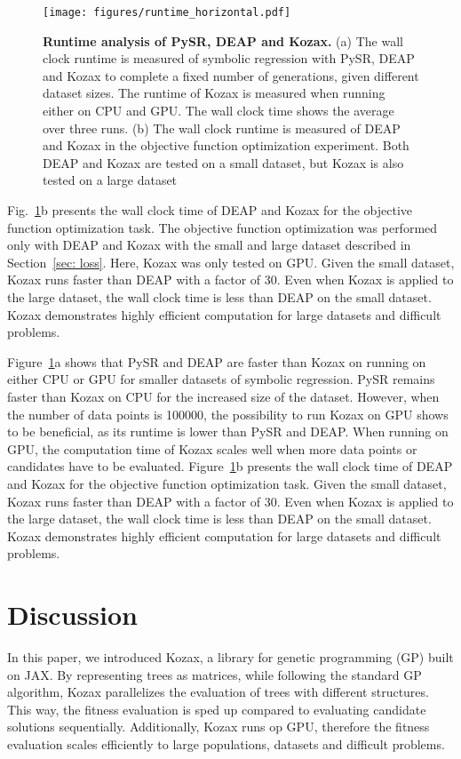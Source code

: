\documentclass{article}
\begin{document}
\begin{figure}[!b]
    \centering
    \texttt{[image: figures/runtime\_horizontal.pdf]}
    \caption{\textbf{Runtime analysis of PySR, DEAP and Kozax.} (a) The wall clock runtime is measured of symbolic regression with PySR, DEAP and Kozax to complete a fixed number of generations, given different dataset sizes. The runtime of Kozax is measured when running either on CPU and GPU. The wall clock time shows the average over three runs. (b) The wall clock runtime is measured of DEAP and Kozax in the objective function optimization experiment. Both DEAP and Kozax are tested on a small dataset, but Kozax is also tested on a large dataset}
    \label{fig:time}
\end{figure}

Fig.~\ref{fig:time}b presents the wall clock time of DEAP and Kozax for the objective function optimization task. The objective function optimization was performed only with DEAP and Kozax with the small and large dataset described in Section~\ref{sec: loss}. Here, Kozax was only tested on GPU. Given the small dataset, Kozax runs faster than DEAP with a factor of 30. Even when Kozax is applied to the large dataset, the wall clock time is less than DEAP on the small dataset. Kozax demonstrates highly efficient computation for large datasets and difficult problems.

Figure~\ref{fig:time}a shows that PySR and DEAP are faster than Kozax on running on either CPU or GPU for smaller datasets of symbolic regression. PySR remains faster than Kozax on CPU for the increased size of the dataset. However, when the number of data points is 100000, the possibility to run Kozax on GPU shows to be beneficial, as its runtime is lower than PySR and DEAP. When running on GPU, the computation time of Kozax scales well when more data points or candidates have to be evaluated. Figure~\ref{fig:time}b presents the wall clock time of DEAP and Kozax for the objective function optimization task. Given the small dataset, Kozax runs faster than DEAP with a factor of 30. Even when Kozax is applied to the large dataset, the wall clock time is less than DEAP on the small dataset. Kozax demonstrates highly efficient computation for large datasets and difficult problems.

\section{Discussion}
In this paper, we introduced Kozax, a library for genetic programming (GP) built on JAX. By representing trees as matrices, while following the standard GP algorithm, Kozax parallelizes the evaluation of trees with different structures. This way, the fitness evaluation is sped up compared to evaluating candidate solutions sequentially. Additionally, Kozax runs op GPU, therefore the fitness evaluation scales efficiently to large populations, datasets and difficult problems.
\end{document}
